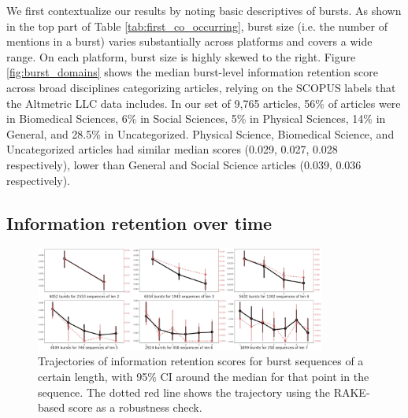 \documentclass[letterpaper]{article} %
\begin{document}
We first contextualize our results by noting basic descriptives of bursts.
As shown in the top part of Table \ref{tab:first_co_occurring}, burst size (i.e. the number of mentions in a burst) varies substantially across platforms and covers a wide range. On each platform, burst size is highly skewed to the right. Figure \ref{fig:burst_domains} shows the median burst-level information retention score across broad disciplines categorizing articles, relying on the SCOPUS labels that the Altmetric LLC data includes. In our set of 9,765 articles, 56\% of articles were in Biomedical Sciences, 6\% in Social Sciences, 5\% in Physical Sciences, 14\% in General, and 28.5\% in Uncategorized. Physical Science, Biomedical Science, and Uncategorized articles had similar median scores (0.029, 0.027, 0.028 respectively), lower than General and Social Science articles (0.039, 0.036 respectively).

\subsection{Information retention over time}

\begin{figure}[ht]
    \centering
    \includegraphics[width=0.85\textwidth]{figs/trajectory_overall.png}
    \caption{Trajectories of information retention scores for burst sequences of a certain length, with 95\% CI around the median for that point in the sequence. The dotted red line shows the trajectory using the RAKE-based score as a robustness check.}
    \label{fig:sequences2_9}
\end{figure}
\end{document}
